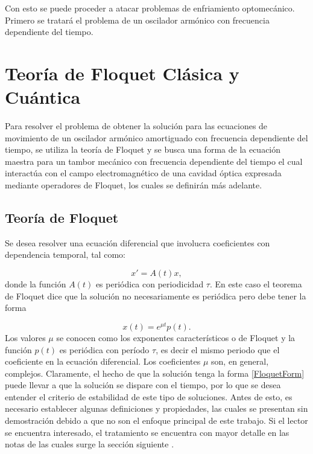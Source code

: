 \documentclass[a4paper,10pt]{report}
\begin{document}
Con esto se puede proceder a atacar problemas de enfriamiento optomecánico. Primero se tratará el problema de un oscilador armónico con frecuencia dependiente del tiempo.


\chapter{Teoría de Floquet Clásica y Cuántica}

Para resolver el problema de obtener la solución para las ecuaciones de movimiento de un oscilador armónico amortiguado con frecuencia dependiente del tiempo, se utiliza la teoría de Floquet \cite{WardFT} y se busca una forma de la ecuación maestra para un tambor mecánico con frecuencia dependiente del tiempo el cual interactúa con el campo electromagnético de una cavidad óptica expresada mediante operadores de Floquet, los cuales se definirán más adelante.

\section{Teoría de Floquet}

Se desea resolver una ecuación diferencial que involucra coeficientes con dependencia temporal, tal como:

\begin{equation}\label{FloquetEquation}
x' = A(t)x,
\end{equation} donde la función $A(t)$ es periódica con periodicidad $\tau$. En este caso el teorema de Floquet\cite{WardFT} dice que la solución no necesariamente es periódica pero debe tener la forma

\begin{equation}\label{FloquetForm}
x(t)=e^{\mu t}p(t).
\end{equation} Los valores $\mu$ se conocen como los exponentes característicos o de Floquet y la función $p(t)$ es periódica con período $\tau$, es decir el mismo periodo que el coeficiente en la ecuación diferencial. Los coeficientes $\mu$ son, en general, complejos. Claramente, el hecho de que la solución tenga la forma \eqref{FloquetForm} puede llevar a que la solución se dispare con el tiempo, por lo que se desea entender el criterio de estabilidad de este tipo de soluciones. Antes de esto, es necesario establecer algunas definiciones y propiedades, las cuales se presentan sin demostración debido a que no son el enfoque principal de este trabajo. Si el lector se encuentra interesado, el tratamiento se encuentra con mayor detalle en las notas de las cuales surge la sección siguiente \cite{WardFT}.
\end{document}
